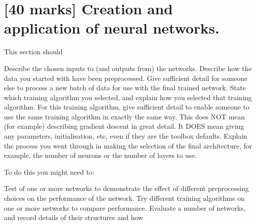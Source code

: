 \documentclass[11pt,a4paper]{article}
\begin{document}



\section{[40 marks] Creation and application of neural networks.}
This section should
\begin{outline}
  \1 Describe the chosen inputs to (and outputs from) the networks.
  \1 Describe how the data you started with have been preprocessed.
  \1 Give sufficient detail for someone else to process a new batch of data for use with the final trained network.
  \1 State which training algorithm you selected, and explain how you selected that training algorithm. For this training algorithm, give sufficient detail to enable someone to use the same training algorithm in exactly the same way. This does NOT mean (for example) describing gradient descent in great detail. It DOES mean giving any parameters, initialisation, etc, even if they are the toolbox defaults.
  \1 Explain the process you went through in making the selection of the final architecture, for example, the number of neurons or the number of layers to use.
\end{outline}




To do this you might need to:
\begin{outline}
  \1 Test of one or more networks to demonstrate the effect of different preprocessing choices on the performance of the network.
  \1 Try different training algorithms on one or more networks to compare performance.
  \1 Evaluate a number of networks, and record details of their structures and how
\end{outline}
\end{document}

